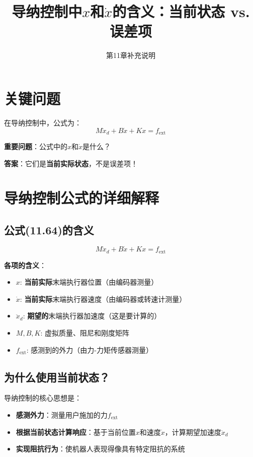 \documentclass[12pt,a4paper]{article}
\title{导纳控制中$x$和$\dot{x}$的含义：当前状态 vs. 误差项}
\author{第11章补充说明}
\date{}
\begin{document}
\maketitle

\section{关键问题}

在导纳控制中，公式为：
\begin{equation}
M\ddot{x}_d + B\dot{x} + Kx = f_{\text{ext}} \tag{11.64}
\end{equation}

\textbf{重要问题}：公式中的$x$和$\dot{x}$是什么？

\textbf{答案}：它们是\textbf{当前实际状态}，不是误差项！

\section{导纳控制公式的详细解释}

\subsection{公式(11.64)的含义}

\begin{equation}
M\ddot{x}_d + B\dot{x} + Kx = f_{\text{ext}}
\end{equation}

\textbf{各项的含义}：
\begin{itemize}
\item $x$: \textbf{当前实际}末端执行器位置（由编码器测量）
\item $\dot{x}$: \textbf{当前实际}末端执行器速度（由编码器或转速计测量）
\item $\ddot{x}_d$: \textbf{期望的}末端执行器加速度（这是要计算的）
\item $M, B, K$: 虚拟质量、阻尼和刚度矩阵
\item $f_{\text{ext}}$: 感测到的外力（由力-力矩传感器测量）
\end{itemize}

\subsection{为什么使用当前状态？}

导纳控制的核心思想是：
\begin{itemize}
\item \textbf{感测外力}：测量用户施加的力$f_{\text{ext}}$
\item \textbf{根据当前状态计算响应}：基于当前位置$x$和速度$\dot{x}$，计算期望加速度$\ddot{x}_d$
\item \textbf{实现阻抗行为}：使机器人表现得像具有特定阻抗的系统
\end{itemize}
\end{document}

